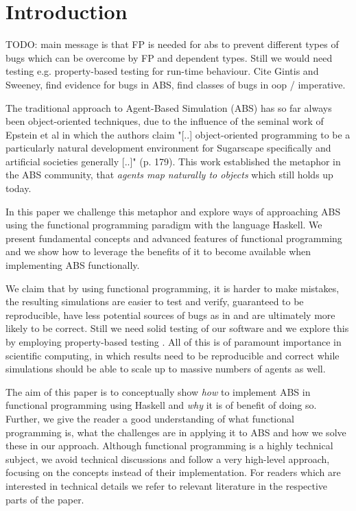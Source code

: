 \section{Introduction}
TODO: main message is that FP is needed for abs to prevent different types of bugs which can be overcome by FP and dependent types. Still we would need testing e.g. property-based testing for run-time behaviour. Cite Gintis and Sweeney, find evidence for bugs in ABS, find classes of bugs in oop / imperative.

The traditional approach to Agent-Based Simulation (ABS) has so far always been object-oriented techniques, due to the influence of the seminal work of Epstein et al \cite{epstein_growing_1996} in which the authors claim "[..] object-oriented programming to be a particularly natural development environment for Sugarscape specifically and artificial societies generally [..]" (p. 179). This work established the metaphor in the ABS community, that \textit{agents map naturally to objects} \citep{north_managing_2007} which still holds up today.

In this paper we challenge this metaphor and explore ways of approaching ABS using the functional programming paradigm with the language Haskell. We present fundamental concepts and advanced features of functional programming and we show how to leverage the benefits of it \citep{hudak_history_2007} to become available when implementing ABS functionally.

We claim that by using functional programming, it is harder to make mistakes, the resulting simulations are easier to test and verify, guaranteed to be reproducible, have less potential sources of bugs as in \citep{vipindeep_list_2005} and are ultimately more likely to be correct. Still we need solid testing of our software and we explore this by employing property-based testing . All of this is of paramount importance in scientific computing, in which results need to be reproducible and correct while simulations should be able to scale up to massive numbers of agents as well. 

The aim of this paper is to conceptually show \textit{how} to implement ABS in functional programming using Haskell and \textit{why} it is of benefit of doing so. Further, we give the reader a good understanding of what functional programming is, what the challenges are in applying it to ABS and how we solve these in our approach. Although functional programming is a highly technical subject, we avoid technical discussions and follow a very high-level approach, focusing on the concepts instead of their implementation. For readers which are interested in technical details we refer to relevant literature in the respective parts of the paper.

